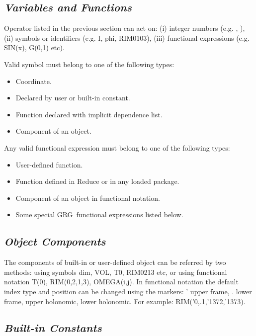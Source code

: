 \documentclass[twocolumn]{article}
\newcommand{\grgtt}{\ttfamily}
\renewcommand{\tt}{\grgtt}
\def\^{{\tt \char'136}}                     %
\def\_{{\tt \char'137}}                     %
\newcommand{\grg}{GRG}
\begin{document}
\subsection{\sf\slshape Variables and Functions}

Operator listed in the previous section can act on:
(i) integer numbers (e.g. {\tt 0}, {\tt 123}),
(ii) symbols or identifiers (e.g. {\tt I}, {\tt phi}, {\tt RIM0103}),
(iii) functional expressions (e.g. {\tt SIN(x)}, {\tt G(0,1)} etc).

Valid symbol must belong to one of the following types:
\begin{itemize}
\item Coordinate.
\item Declared by user or built-in constant.
\item Function declared with implicit dependence list.
\item Component of an object.
\end{itemize}

Any valid functional expression must belong to one of the following types:
\itemsep=0.5mm
\begin{itemize}
\item User-defined function.
\item Function defined in {\sc Reduce} or in any loaded package.
\item Component of an object in functional notation.
\item Some special \grg\ functional expressions listed below.
\end{itemize}


\subsection{\sf\slshape Object Components}

The components of built-in or user-defined object can be
referred by two methods: using symbols {\tt dim},
{\tt VOL}, {\tt T0}, {\tt RIM0213} etc, or using functional
notation {\tt T(0)}, {\tt RIM(0,2,1,3)}, {\tt OMEGA(i,j)}.
In functional notation the default index type and position
can be changed using the markers: {\tt '} upper frame,
{\tt .} lower frame, {\tt \^} upper holonomic, {\tt \_} lower
holonomic. For example: {\tt RIM('0,.1,\_2,\_3)}.



\subsection{\sf\slshape Built-in Constants}
\end{document}
